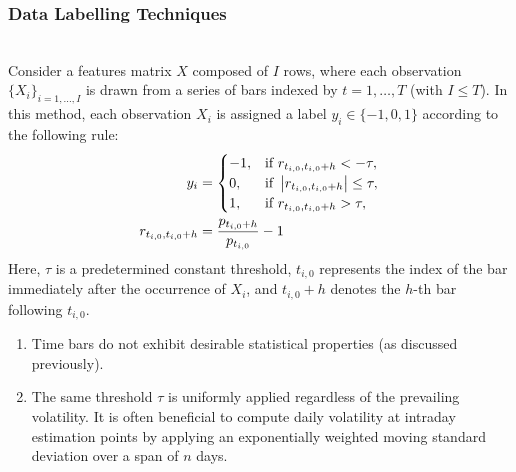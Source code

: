 \subsubsection{Data Labelling Techniques}

\begin{method} \\
Consider a features matrix $X$ composed of $I$ rows, where each observation $\{X_i\}_{i=1,\ldots,I}$ is drawn from a series of bars indexed by $t = 1,\ldots,T$ (with $I \leq T$). In this method, each observation $X_i$ is assigned a label $y_i \in \{-1, 0, 1\}$ according to the following rule:
\begin{align}
y_i &=
\begin{cases}
-1, & \text{if } r_{t_{i,0}, t_{i,0} + h} < -\tau, \\
0,  & \text{if } \left\lvert r_{t_{i,0}, t_{i,0} + h}\right\rvert \leq \tau, \\
1,  & \text{if } r_{t_{i,0}, t_{i,0} + h} > \tau,
\end{cases} \nonumber \\
r_{t_{i,0}, t_{i,0} + h} &= \frac{p_{t_{i,0}+h}}{p_{t_{i,0}}} - 1 \nonumber
\end{align}
Here, $\tau$ is a predetermined constant threshold, $t_{i,0}$ represents the index of the bar immediately after the occurrence of $X_i$, and $t_{i,0}+h$ denotes the $h$-th bar following $t_{i,0}$.
\end{method}

\begin{remark} 
\begin{enumerate}[label=\roman*.]
\setlength{\itemsep}{0pt}
\item Time bars do not exhibit desirable statistical properties (as discussed previously).
\item The same threshold $\tau$ is uniformly applied regardless of the prevailing volatility. It is often beneficial to compute daily volatility at intraday estimation points by applying an exponentially weighted moving standard deviation over a span of $n$ days.
\end{enumerate}
\end{remark}

